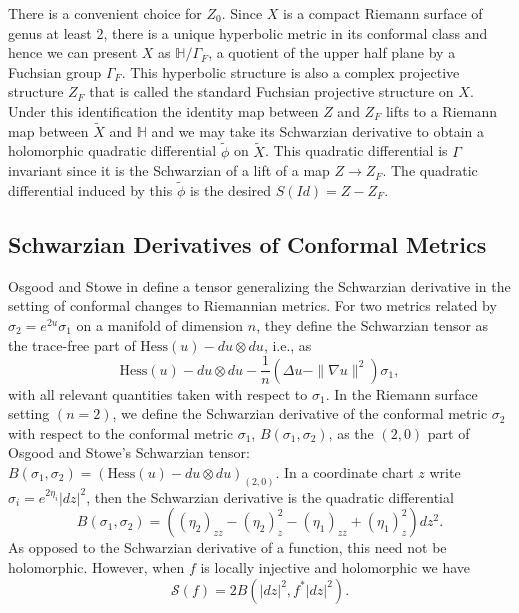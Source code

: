 \documentclass{amsart}
\renewcommand{\H}{\mathbb{H}}
\begin{document}
There is a convenient choice for $Z_0$. 
Since $X$ is a compact Riemann surface of genus at least 2, there is a unique hyperbolic metric in its conformal class and hence we can present $X$ as $\H/\Gamma_F$, a quotient of the upper half plane by a Fuchsian group $\Gamma_F$. 
This hyperbolic structure is also a complex projective structure $Z_F$ that is called the standard Fuchsian projective structure on $X$. 
Under this identification the identity map between $Z$ and $Z_F$ lifts to a Riemann map between $\tilde{X}$ and  $\H$ and we may take its Schwarzian derivative to obtain a holomorphic quadratic differential $\tilde{\phi}$ on $\tilde{X}$. 
This quadratic differential is $\Gamma$ invariant since it is the Schwarzian of a lift of a map $Z \to Z_F$. 
The quadratic differential induced by this $\tilde{\phi}$ is the desired $S(Id) = Z-Z_F$.



\subsection{Schwarzian Derivatives of Conformal Metrics}



Osgood and Stowe in \cite{osgood-stowe1992} define a tensor generalizing the Schwarzian derivative in the setting of conformal changes to Riemannian metrics. 
For two metrics related by $\sigma_2 = e^{2u} \sigma_1$ on a manifold of dimension $n$, they define the Schwarzian tensor as the trace-free part of $\mathrm{Hess}(u) - du \otimes du$, i.e., as
\[
\mathrm{Hess}(u) - du \otimes du - \frac{1}{n}\left( \Delta u - \| \nabla u \|^2\right)\sigma_1,
\]
with all relevant quantities taken with respect to $\sigma_1$. 
In the Riemann surface setting $(n=2)$, we define the Schwarzian derivative of the conformal metric $\sigma_2$ with respect to the conformal metric $\sigma_1$, $B(\sigma_1,\sigma_2)$, as the $(2,0)$ part of Osgood and Stowe's Schwarzian tensor: $B(\sigma_1,\sigma_2) = \left(\mathrm{Hess}(u) - du \otimes du\right)_{(2,0)}$. 
In a coordinate chart $z$  write $\sigma_i = e^{2\eta_i} |dz|^2$, then the Schwarzian derivative is the quadratic differential 
 \[
 B(\sigma_1,\sigma_2) = \left( (\eta_2)_{zz} - (\eta_2)_z^2 - (\eta_1)_{zz} + (\eta_1)_z^2 \right) dz^2.
 \]
As opposed to the Schwarzian derivative of a function, this need not be holomorphic. 
However, when $f$ is locally injective and holomorphic we have
 \[
 \mathcal{S}(f) = 2B(|dz|^2,f^*|dz|^2).
 \]
 
\end{document}
